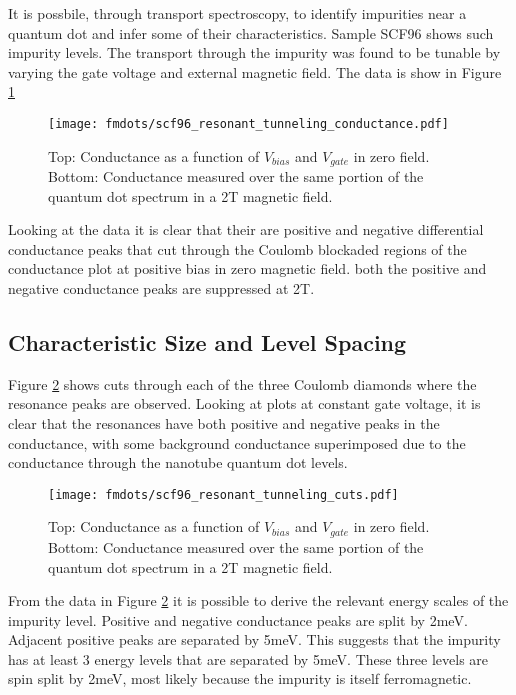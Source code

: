 It is possbile, through transport spectroscopy, to identify impurities near a quantum dot and infer some of their characteristics. Sample SCF96 shows such impurity levels. The transport through the impurity was found to be tunable by varying the gate voltage and external magnetic field. The data is show in Figure \ref{fig:resonant_tunneling}

\begin{figure}
    \centering
    \texttt{[image: fmdots/scf96\_resonant\_tunneling\_conductance.pdf]}
    \caption{Top: Conductance as a function of $V_{bias}$ and $V_{gate}$ in zero field. Bottom: Conductance measured over the same portion of the quantum dot spectrum in a 2T magnetic field.}
    \label{fig:resonant_tunneling}
\end{figure}

Looking at the data it is clear that their are positive and negative differential conductance peaks that cut through the Coulomb blockaded regions of the conductance plot at positive bias in zero magnetic field. both the positive and negative conductance peaks are suppressed at 2T.

\subsection{Characteristic Size and Level Spacing}

Figure \ref{fig:resonance_cuts} shows cuts through each of the three Coulomb diamonds where the resonance peaks are observed. Looking at plots at constant gate voltage, it is clear that the resonances have both positive and negative peaks in the conductance, with some background conductance superimposed due to the conductance through the nanotube quantum dot levels.

\begin{figure}
    \centering
    \texttt{[image: fmdots/scf96\_resonant\_tunneling\_cuts.pdf]}
    \caption{Top: Conductance as a function of $V_{bias}$ and $V_{gate}$ in zero field. Bottom: Conductance measured over the same portion of the quantum dot spectrum in a 2T magnetic field.}
    \label{fig:resonance_cuts}
\end{figure}

From the data in Figure \ref{fig:resonance_cuts} it is possible to derive the relevant energy scales of the impurity level. Positive and negative conductance peaks are split by 2meV. Adjacent positive peaks are separated by 5meV. This suggests that the impurity has at least 3 energy levels that are separated by 5meV. These three levels are spin split by 2meV, most likely because the impurity is itself ferromagnetic.

